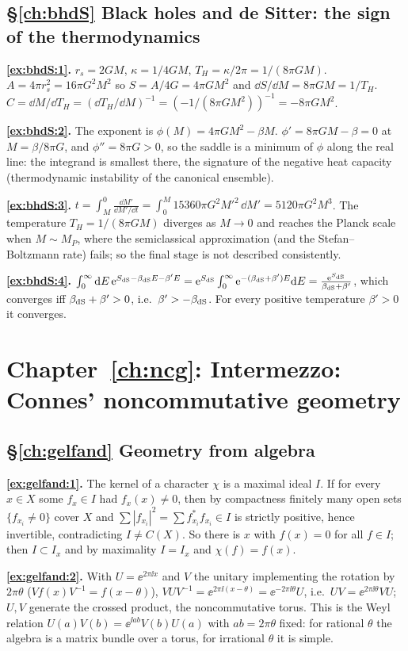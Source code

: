 {\subsection*{\S\ref{ch:bhdS} Black holes and de Sitter: the sign of the thermodynamics}
\textbf{\ref{ex:bhdS:1}.} $r_s=2GM$, $\kappa=1/4GM$, $T_H=\kappa/2\pi=1/(8\pi GM)$. $A=4\pi r_s^2=16\pi G^2M^2$ so $S=A/4G=4\pi GM^2$ and $\dd S/\dd M=8\pi GM=1/T_H$. $C=\dd M/\dd T_H=(\dd T_H/\dd M)^{-1}=(-1/(8\pi GM^2))^{-1}=-8\pi GM^2$.\par
\textbf{\ref{ex:bhdS:2}.} The exponent is $\phi(M)=4\pi GM^2-\beta M$. $\phi'=8\pi GM-\beta=0$ at $M=\beta/8\pi G$, and $\phi''=8\pi G>0$, so the saddle is a minimum of $\phi$ along the real line: the integrand is smallest there, the signature of the negative heat capacity (thermodynamic instability of the canonical ensemble).\par
\textbf{\ref{ex:bhdS:3}.} $t=\int_M^0\frac{\dd M'}{\dd M'/\dd t}=\int_0^M15360\pi G^2M'^2\,\dd M'=5120\pi G^2M^3$. The temperature $T_H=1/(8\pi GM)$ diverges as $M\to0$ and reaches the Planck scale when $M\sim M_P$, where the semiclassical approximation (and the Stefan--Boltzmann rate) fails; so the final stage is not described consistently.\par
\textbf{\ref{ex:bhdS:4}.} $\int_0^\infty\mathrm{d} E\,\mathrm{e}^{S_{\rm dS}-\beta_{\rm dS}E-\beta'E}=\mathrm{e}^{S_{\rm dS}}\int_0^\infty\mathrm{e}^{-(\beta_{\rm dS}+\beta')E}\mathrm{d} E=\frac{\mathrm{e}^{S_{\rm dS}}}{\beta_{\rm dS}+\beta'}$, which converges iff $\beta_{\rm dS}+\beta'>0$, i.e.\ $\beta'>-\beta_{\rm dS}$. For every positive temperature $\beta'>0$ it converges.\par

\section*{Chapter~\ref{ch:ncg}: Intermezzo: Connes' noncommutative geometry}

\subsection*{\S\ref{ch:gelfand} Geometry from algebra}
\textbf{\ref{ex:gelfand:1}.} The kernel of a character $\chi$ is a maximal ideal $I$. If for every $x\in X$ some $f_x\in I$ had $f_x(x)\ne0$, then by compactness finitely many open sets $\{f_{x_i}\ne0\}$ cover $X$ and $\sum|f_{x_i}|^2=\sum f_{x_i}^*f_{x_i}\in I$ is strictly positive, hence invertible, contradicting $I\ne C(X)$. So there is $x$ with $f(x)=0$ for all $f\in I$; then $I\subset I_x$ and by maximality $I=I_x$ and $\chi(f)=f(x)$.\par
\textbf{\ref{ex:gelfand:2}.} With $U=\ee^{2\pi\ii x}$ and $V$ the unitary implementing the rotation by $2\pi\theta$ ($Vf(x)V^{-1}=f(x-\theta)$), $VUV^{-1}=\ee^{2\pi\ii(x-\theta)}=\ee^{-2\pi\ii\theta}U$, i.e.\ $UV=\ee^{2\pi\ii\theta}VU$; $U,V$ generate the crossed product, the noncommutative torus. This is the Weyl relation $U(a)V(b)=\ee^{\ii ab}V(b)U(a)$ with $ab=2\pi\theta$ fixed: for rational $\theta$ the algebra is a matrix bundle over a torus, for irrational $\theta$ it is simple.\par

}
